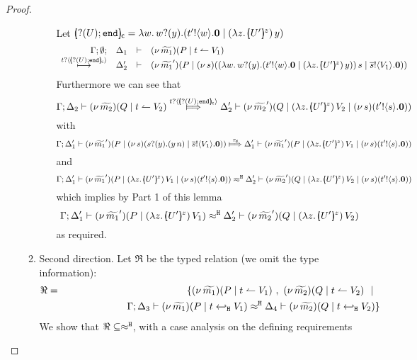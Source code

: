 \begin{proof}
\begin{enumerate}[$-$]
\begin{enumerate}
\begin{enumerate}[i)]
							Let $\omapchar{\btinp{U} \tinact} = \abs{w}{ \binp{w}{y} ( \bout{t'}{w} \inact \Par \appl{(\abs{z}{\mapchar{U'}{z}})}{y} ) } $
							\[
								\mhorel{\Gamma}{\Delta_1}{\newsp{\widetilde{m_1}}{P \Par \ntrigger{t}{V_1}  } }
								{\hby{\bactinp{t}{\omapchar{\btinp{U} \tinact}}}}
								{\Delta_2'}{}{\newsp{\widetilde{m_1}'}{P \Par \newsp{s}{\appl{(\abs{w}{ \binp{w}{y} ( \bout{t'}{w} \inact \Par \appl{(\abs{z}{\mapchar{U'}{z}})}{y} ) })}{s} \Par \bout{\dual{s}}{V_1} \inact}}}
							\]
							Furthermore we can see that
							\[
								\horel{\Gamma}{\Delta_2}{\newsp{\widetilde{m_2}}{Q \Par \ntrigger{t}{V_2}  } }
								{\Hby{\bactinp{t}{\omapchar{\btinp{U} \tinact}}}}
								{\Delta_2'}{\newsp{\widetilde{m_2}'}{Q \Par \appl{(\abs{z}{\mapchar{U'}{z}})}{V_2} \Par \newsp{s}{\bout{t'}{s} \inact}}}
							\]
							with
							\[
								\horel{\Gamma}{\Delta_1'}{\newsp{\widetilde{m_1}'}{P \Par \newsp{s}{\binp{s}{y} (\appl{y}{n}) \Par \bout{\dual{s}}{V_1} \inact}}}
								{\Hby{\dtau}}
								{\Delta_1'}{\newsp{\widetilde{m_1}'}{P \Par \appl{(\abs{z}{\mapchar{U'}{z}})}{V_1} \Par \newsp{s}{\bout{t'}{s} \inact}}}
							\]
							and
							\[
								\horel{\Gamma}{\Delta_1'}{\newsp{\widetilde{m_1}'}{P \Par \appl{(\abs{z}{\mapchar{U'}{z}})}{V_1} \Par \newsp{s}{\bout{t'}{s} \inact}}}
								{\hwb}
								{\Delta_2'}{\newsp{\widetilde{m_2}'}{Q \Par \appl{(\abs{z}{\mapchar{U'}{z}})}{V_2} \Par \newsp{s}{\bout{t'}{s} \inact}}}
							\]
							which implies by Part 1 of this lemma
							\[
								\horel{\Gamma}{\Delta_1'}{\newsp{\widetilde{m_1}'}{P \Par \appl{(\abs{z}{\mapchar{U'}{z}})}{V_1}}}
								{\hwb}
								{\Delta_2'}{\newsp{\widetilde{m_2}'}{Q \Par \appl{(\abs{z}{\mapchar{U'}{z}})}{V_2}}}
							\]
							as required.
				\end{enumerate}
		\item	Second direction.
				Let $\Re$ be the typed relation (we omit the type information):
				\begin{eqnarray*}
		\Re &=&	\set{	\newsp{\widetilde{m_1}}{P \Par \ntrigger{t}{V_1}}\ ,\ 
									\newsp{\widetilde{m_2}}{Q \Par \ntrigger{t}{V_2}} \setbar\\
						&&
							\qquad \qquad \qquad		\horel{\Gamma}{\Delta_3}{\newsp{\widetilde{m_1}}{P \Par \htrigger{t}{V_1}  } }
									{\hwb}
									{\Delta_4}{\newsp{\widetilde{m_2}}{Q \Par \htrigger{t}{V_2}  } }
					}
				\end{eqnarray*}
				We show that $\Re \subseteq \approx^\mathtt{H}$, with a case analysis on the defining requirements

\end{enumerate}
\end{enumerate}
\end{proof}
